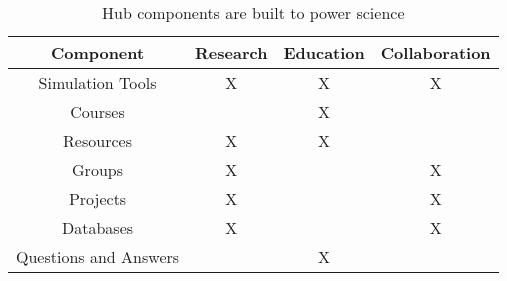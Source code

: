 \begin{table}[t]
  \centering
  \caption{Hub components are built to power science}
  \begin{tabular}{ | c | c | c | c | }
    \hline
    Component               & Research  & Education   & Collaboration  \\ \hline %
    Simulation Tools        &    X      &     X       &       X        \\ \hline %
    Courses                 &           &     X       &                \\ \hline %
    Resources               &    X      &     X       &                \\ \hline %
    Groups                  &    X      &             &       X        \\ \hline %
    Projects                &    X      &             &       X        \\ \hline %
    Databases               &    X      &             &       X        \\ \hline %
    Questions and Answers   &           &     X       &                \\ \hline %
  \end{tabular}
  \label{tab:componentsPowerScience}
\end{table}



